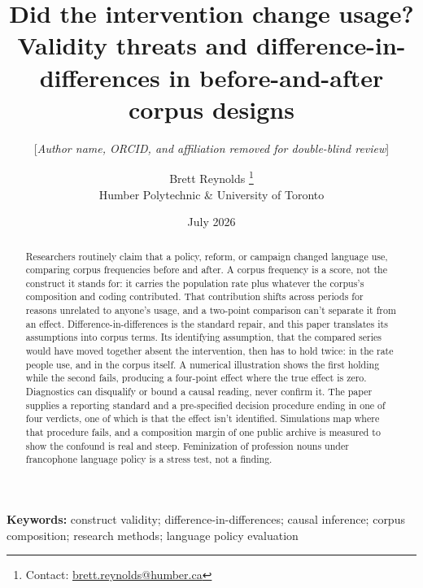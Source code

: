 \documentclass[12pt]{article}
\title{Did the intervention change usage?\\
{\large Validity threats and difference-in-differences in before-and-after corpus designs}}
\author{[\textit{Author name, ORCID, and affiliation removed for double-blind review}]}
\author{Brett Reynolds \orcidlink{0000-0003-0073-7195}%
  \thanks{Contact: \href{mailto:brett.reynolds@humber.ca}{brett.reynolds@humber.ca}}\\
  Humber Polytechnic \& University of Toronto}
\date{July 2026}
\begin{document}
\maketitle

\begin{abstract}
Researchers routinely claim that a policy, reform, or campaign changed language use, comparing corpus frequencies before and after. A corpus frequency is a score, not the construct it stands for: it carries the population rate plus whatever the corpus's composition and coding contributed. That contribution shifts across periods for reasons unrelated to anyone's usage, and a two-point comparison can't separate it from an effect. Difference-in-differences is the standard repair, and this paper translates its assumptions into corpus terms. Its identifying assumption, that the compared series would have moved together absent the intervention, then has to hold twice: in the rate people use, and in the corpus itself. A numerical illustration shows the first holding while the second fails, producing a four-point effect where the true effect is zero. Diagnostics can disqualify or bound a causal reading, never confirm it. The paper supplies a reporting standard and a pre-specified decision procedure ending in one of four verdicts, one of which is that the effect isn't identified. Simulations map where that procedure fails, and a composition margin of one public archive is measured to show the confound is real and steep. Feminization of profession nouns under francophone language policy is a stress test, not a finding.
\end{abstract}

\noindent\textbf{Keywords:} construct validity; difference-in-differences; causal inference; corpus composition; research methods; language policy evaluation









\FloatBarrier

\end{document}
